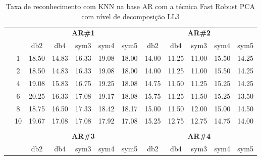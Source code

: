 \begin{table}[H]
	\centering
    \normalsize
	\caption{Taxa de reconhecimento com KNN na base AR com a técnica Fast Robust PCA com nível de decomposição LL3}
	\begin{tabular}{|c|c|c c c c c|c c c c c|}
\cline{3-12}
\multicolumn{2}{c|}{\multirow{2}{*}{}} & \multicolumn{5}{c|}{\textbf{AR\#1}}  & \multicolumn{5}{c|}{\textbf{AR\#2}} \\\cline{3-12}

\multicolumn{2}{c|}{}  & db2 & db4 & sym3 & sym4 & sym5 & db2 & db4& sym3 & sym4 & sym5 \\\hline

\multicolumn{1}{|c|}{ \multirow{5}{*}{\rotatebox[origin=c]{90}{\textbf{K-vizinhos}}} }
&1	&18.50	&14.83	&16.33	&19.08	&18.00	&14.00	&11.25	&11.00	&15.50&	14.25\\\cline{2-12}
&2	&18.50	&14.83	&16.33	&19.08	&18.00	&14.00	&11.25	&11.00	&15.50&	14.25\\\cline{2-12}
&4	&19.08	&15.83	&16.75	&19.25	&18.08	&14.75	&11.50	&11.25	&15.25&	14.25\\\cline{2-12}
&6	&20.25	&16.33	&17.08	&19.17	&18.08	&15.75	&11.25	&11.50	&15.25&	13.50\\\cline{2-12}
&8	&18.75	&16.50	&17.33	&18.42	&18.17	&15.00	&11.50	&12.00	&15.00&	14.50\\\cline{2-12}
&10	&19.67	&17.08	&17.08	&17.92	&17.08	&15.25	&12.75	&12.75	&14.75&	14.00


\\ \midrule
\multicolumn{12}{c}{}\\ 

\cline{3-12}
\multicolumn{2}{c}{} & \multicolumn{5}{|c|}{\textbf{AR\#3}}  & \multicolumn{5}{c|}{\textbf{AR\#4}} \\\cline{3-12}
\multicolumn{2}{c}{}  & \multicolumn{1}{|c}{db2} & db4 & sym3 & sym4 & sym5 & db2 & db4& sym3 & sym4 & sym5 \\\hline


\end{tabular}
\end{table}
